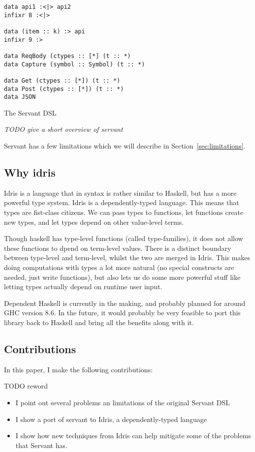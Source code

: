 \documentclass[12pt,a4paper]{article}
\begin{document}
\begin{listing}[H]
\begin{verbatim}
data api1 :<|> api2
infixr 8 :<|>

data (item :: k) :> api
infixr 9 :>

data ReqBody (ctypes :: [*] (t :: *)
data Capture (symbol :: Symbol) (t :: *)

data Get (ctypes :: [*]) (t :: *)
data Post (ctypes :: [*]) (t :: *)
data JSON
\end{verbatim}
\caption{The Servant DSL}
\label{lab:servant}
\end{listing}

\emph{TODO give a short overview of servant}



Servant has a few limitations which we will describe in Section~\ref{sec:limitations}. 


\subsection{Why idris}
Idris is a language that in syntax is rather similar to Haskell, but has a more powerful type system. Idris is a dependently-typed language. This means that types are fist-class citizens. We can pass types to functions, let functions create new types, and let types depend on other value-level terms.

Though haskell has type-level functions (called type-families), it does not allow these functions to dpend on term-level values. There is a distinct boundary between type-level and term-level, whilst the two are merged in Idris. This makes doing computations with types a lot more natural (no special constructs are needed, just write functions), but also lets us do some more powerful stuff like letting types actually depend on runtime user input.

Dependent Haskell is currently in the making, and probably planned for around GHC version 8.6. In the future, it would probably be very feasible to port this library back to Haskell and bring all the benefits along with it.

\subsection{Contributions}
In this paper, I make the following contributions:

TODO reword
\begin{itemize}
  \item I point out several problems an limitations of the original Servant DSL
  \item I show a port of servant to Idris, a dependently-typed language
  \item I show how new techniques from Idris can help mitigate some of the problems that Servant has.
\end{itemize}
\end{document}
